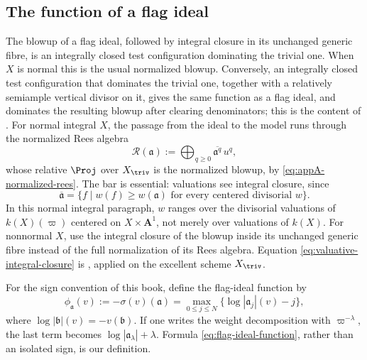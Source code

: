 \subsection{The function of a flag ideal}
\label{sec:ch33-flag-function}

The blowup of a flag ideal, followed by integral closure in its unchanged
generic fibre, is an integrally closed test configuration dominating the
trivial one.  When $X$ is normal this is the usual normalized blowup.
Conversely, an integrally closed test configuration that dominates the
trivial one, together with a relatively semiample vertical divisor on it,
gives the same function as a flag ideal, and dominates the resulting
blowup after clearing denominators; this is the content of
.  For normal integral $X$, the passage from
the ideal to the model runs through the normalized Rees algebra
\begin{equation}
\label{eq:flag-rees-algebra}
   \mathcal R(\mathfrak a)
      :=\bigoplus_{q\geq0}\overline{\mathfrak a^q}\,u^q ,
\end{equation}
whose relative $\Proj$ over $X_{\triv}$ is the normalized blowup, by
\eqref{eq:appA-normalized-rees}.  The bar is essential: valuations see
integral closure, since
\begin{equation}
\label{eq:valuative-integral-closure}
 \overline{\mathfrak a}
   =\{f\mid w(f)\geq w(\mathfrak a)
             \text{ for every centered divisorial }w\}.
\end{equation}
In this normal integral paragraph, $w$ ranges over the divisorial
valuations of $k(X)(\varpi)$ centered on $X\times\mathbf A^1$, not merely
over valuations of $k(X)$.  For nonnormal $X$, use the integral closure
of the blowup inside its unchanged generic fibre instead of the full
normalization of its Rees algebra.
Equation \eqref{eq:valuative-integral-closure} is
, applied on the excellent scheme
$X_{\triv}$.

For the sign convention of this book, define the flag-ideal function by
\begin{equation}
\label{eq:flag-ideal-function}
 \phi_{\mathfrak a}(v)
   :=-\sigma(v)(\mathfrak a)
   =\max_{0\leq j\leq N}
        \{\log|\mathfrak a_j|(v)-j\},
\end{equation}
where $\log|\mathfrak b|(v)=-v(\mathfrak b)$.  If one writes the weight
decomposition with $\varpi^{-\lambda}$, the last term becomes
$\log|\mathfrak a_\lambda|+\lambda$.  Formula
\eqref{eq:flag-ideal-function}, rather than an isolated sign, is our
definition.

